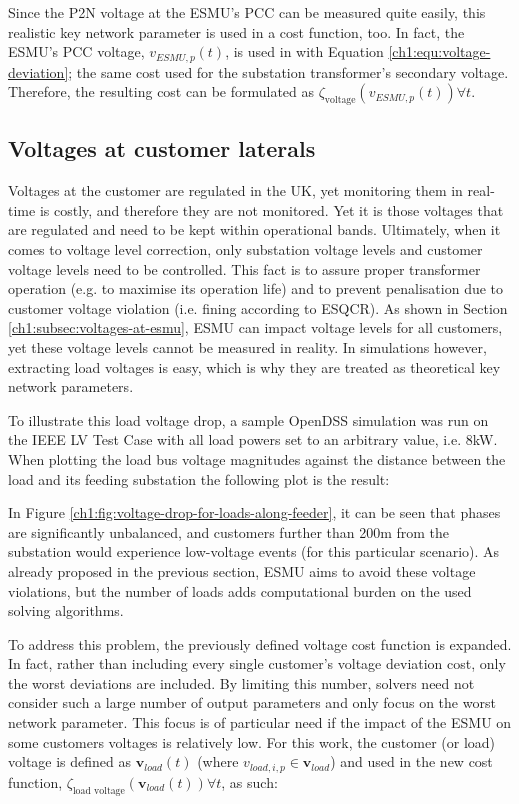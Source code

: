 Since the P2N voltage at the ESMU's PCC can be measured quite easily, this realistic key network parameter is used in a cost function, too.
In fact, the ESMU's PCC voltage, $v_{ESMU,p}(t)$, is used in with Equation \ref{ch1:equ:voltage-deviation}; the same cost used for the substation transformer's secondary voltage.
Therefore, the resulting cost can be formulated as $\zeta_\text{voltage}(v_{ESMU,p}(t)) \forall t$.

\subsection{Voltages at customer laterals}
\label{ch1:subsec:voltages-at-customers}

Voltages at the customer are regulated in the UK, yet monitoring them in real-time is costly, and therefore they are not monitored.
Yet it is those voltages that are regulated and need to be kept within operational bands.
Ultimately, when it comes to voltage level correction, only substation voltage levels and customer voltage levels need to be controlled.
This fact is to assure proper transformer operation (e.g. to maximise its operation life) and to prevent penalisation due to customer voltage violation (i.e. fining according to ESQCR).
As shown in Section \ref{ch1:subsec:voltages-at-esmu}, ESMU can impact voltage levels for all customers, yet these voltage levels cannot be measured in reality.
In simulations however, extracting load voltages is easy, which is why they are treated as theoretical key network parameters.

To illustrate this load voltage drop, a sample OpenDSS simulation was run on the IEEE LV Test Case with all load powers set to an arbitrary value, i.e. 8kW.
When plotting the load bus voltage magnitudes against the distance between the load and its feeding substation the following plot is the result:



In Figure \ref{ch1:fig:voltage-drop-for-loads-along-feeder}, it can be seen that phases are significantly unbalanced, and customers further than 200m from the substation would experience low-voltage events (for this particular scenario).
As already proposed in the previous section, ESMU aims to avoid these voltage violations, but the number of loads adds computational burden on the used solving algorithms.

To address this problem, the previously defined voltage cost function is expanded.
In fact, rather than including every single customer's voltage deviation cost, only the worst deviations are included.
By limiting this number, solvers need not consider such a large number of output parameters and only focus on the worst network parameter.
This focus is of particular need if the impact of the ESMU on some customers voltages is relatively low.
For this work, the customer (or load) voltage is defined as $\textbf{v}_{load}(t)$ (where $v_{load,i,p} \in \textbf{v}_{load}$) and used in the new cost function, $\zeta_\text{load voltage}(\textbf{v}_{load}(t)) \forall t$, as such:

